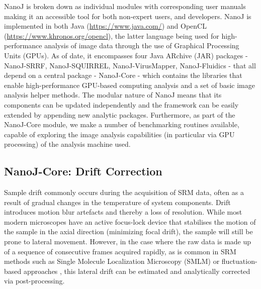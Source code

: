  NanoJ is broken down as individual modules with corresponding user manuals making it an accessible tool for both non-expert users, and developers. NanoJ is implemented in both Java (\href{https://www.java.com/}{https://www.java.com/}) and OpenCL (\href{https://www.khronos.org/opencl}{https://www.khronos.org/opencl}), the latter language being used for high-performance analysis of image data through the use of Graphical Processing Units (GPUs). As of date, it encompasses four Java ARchive (JAR) packages - NanoJ-SRRF, NanoJ-SQUIRREL, NanoJ-VirusMapper, NanoJ-Fluidics - that all depend on a central package - NanoJ-Core - which contains the libraries that enable high-performance GPU-based computing analysis and a set of basic image analysis helper methods. The modular nature of NanoJ means that its components can be updated independently and the framework can be easily extended by appending new analytic packages. Furthermore, as part of the NanoJ-Core module, we make a number of benchmarking routines available, capable of exploring the image analysis capabilities (in particular via GPU processing) of the analysis machine used.

\subsection*{NanoJ-Core: Drift Correction}
Sample drift commonly occurs during the acquisition of SRM data, often as a result of gradual changes in the temperature of system components. Drift introduces motion blur artefacts and thereby a loss of resolution. While most modern microscopes have an active focus-lock device that stabilises the motion of the sample in the axial direction (minimizing focal drift), the sample will still be prone to lateral movement. However, in the case where the raw data is made up of a sequence of consecutive frames acquired rapidly, as is common in SRM methods such as Single Molecule Localization Microscopy (SMLM) \cite{betzig2006imaging,rust2006sub} or fluctuation-based approaches \cite{gustafsson2016fast,dertinger2009fast,cox2012bayesian}, this lateral drift can be estimated and analytically corrected via post-processing.
 
